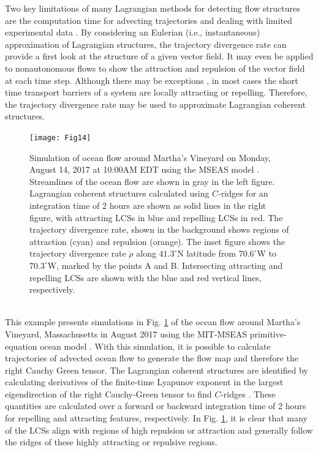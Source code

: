 \documentclass[twocolumn]{svjour3}
\begin{document}
Two key limitations of many Lagrangian methods for detecting flow structures are the computation time for advecting trajectories \cite{ameli2014development,brunton2010fast} and dealing with limited experimental data \cite{garth2007efficient}. By considering an Eulerian (i.e., instantaneous) approximation of Lagrangian structures, the trajectory divergence rate can provide a first look at the structure of a given vector field. It may even be applied to nonautonomous flows to show the attraction and repulsion of the vector field at each time step. Although there may be exceptions \cite{tallapragada2017globally}, in most cases the short time transport barriers of a system are locally attracting or repelling. Therefore, the trajectory divergence rate may be used to approximate Lagrangian coherent structures. 

\begin{figure}
\centering
\texttt{[image: Fig14]}
\caption{Simulation of ocean flow around Martha's Vineyard on Monday, August 14, 2017 at 10:00AM EDT using the MSEAS model \cite{de2014relocatable}. Streamlines of the ocean flow are shown in gray in the left figure. Lagrangian coherent structures calculated using $C$-ridges \cite{schindler2012ridge} for an integration time of 2 hours are shown as solid lines in the right figure, with attracting LCSs in blue and repelling LCSs in red. The trajectory divergence rate, shown in the background shows regions of attraction (cyan) and repulsion (orange). The inset figure shows the trajectory divergence rate $\dot{\rho}$ along $41.3^\circ$N latitude from $70.6^\circ$W to $70.3^\circ$W, marked by the points A and B. Intersecting attracting and repelling LCSs are shown with the blue and red vertical lines, respectively.}
\label{fig:LCScomp}
\end{figure}

 \\
This example presents simulations in Fig. \ref{fig:LCScomp} of the ocean flow around Martha's Vineyard, Massachusetts in August 2017 using the MIT-MSEAS primitive-equation ocean model \cite{haley2010multiscale}. With this simulation, it is possible to calculate trajectories of advected ocean flow to generate the flow map and therefore the right Cauchy Green tensor. The Lagrangian coherent structures are identified by calculating derivatives of the finite-time Lyapunov exponent in the largest eigendirection of the right Cauchy-Green tensor to find $C$-ridges \cite{schindler2012ridge}. These quantities are calculated over a forward or backward integration time of 2 hours for repelling and attracting features, respectively. In Fig. \ref{fig:LCScomp}, it is clear that many of the LCSs align with regions of high repulsion or attraction and generally follow the ridges of these highly attracting or repulsive regions.
\end{document}
